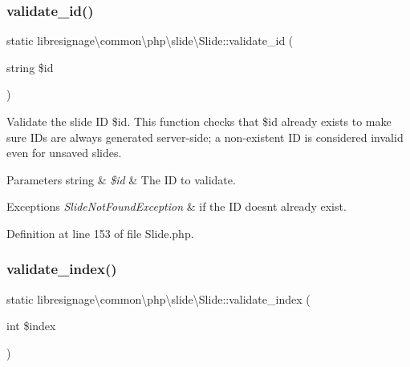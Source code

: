 \subsubsection{\texorpdfstring{validate\+\_\+id()}{validate\_id()}}
{\footnotesize\ttfamily static libresignage\textbackslash{}common\textbackslash{}php\textbackslash{}slide\textbackslash{}\+Slide\+::validate\+\_\+id (\begin{DoxyParamCaption}\item[{string}]{\$id }\end{DoxyParamCaption})\hspace{0.3cm}{\ttfamily [static]}}

Validate the slide ID \$id. This function checks that \$id already exists to make sure I\+Ds are always generated server-\/side; a non-\/existent ID is considered invalid even for unsaved slides.


\begin{DoxyParams}[1]{Parameters}
string & {\em \$id} & The ID to validate.\\
\hline
\end{DoxyParams}

\begin{DoxyExceptions}{Exceptions}
{\em Slide\+Not\+Found\+Exception} & if the ID doesn\textquotesingle{}t already exist. \\
\hline
\end{DoxyExceptions}


Definition at line 153 of file Slide.\+php.

\mbox{\label{classlibresignage_1_1common_1_1php_1_1slide_1_1Slide_a77792fc7026c05a530644dddf5eadc45}} 
\subsubsection{\texorpdfstring{validate\+\_\+index()}{validate\_index()}}
{\footnotesize\ttfamily static libresignage\textbackslash{}common\textbackslash{}php\textbackslash{}slide\textbackslash{}\+Slide\+::validate\+\_\+index (\begin{DoxyParamCaption}\item[{int}]{\$index }\end{DoxyParamCaption})\hspace{0.3cm}{\ttfamily [static]}}

